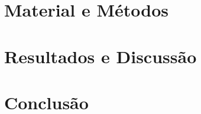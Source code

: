 \documentclass[
	12pt,				%
	openright,			%
	oneside,			%
	a4paper,			%
	brazil				%
	]{abntex2}
\begin{document}
\chapter{Material e Métodos} 
\label{chap:mati}


\chapter{Resultados e Discussão} 
\label{chap:resul}


\chapter{Conclusão} 
\label{chap:conc}






\postextual




% 


\begin{anexosenv}

\partanexos
\renewcommand{\ABNTEXchapterfontsize}{\ABNTEXsectionfont}



\end{anexosenv}
\end{document}
